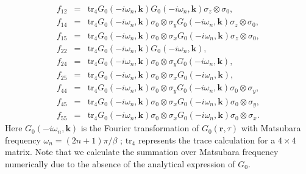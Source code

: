 \documentclass[prl,aps,twocolumn,showpacs, floatfix]{revtex4}
\begin{document}
\begin{widetext}
\begin{eqnarray}
f_{12} & =&\text{tr}_{4}{G}_{0}(-i\omega_{n},\mathbf{k}){G}_{0}(-i\omega_{n},%
\mathbf{k})\sigma_{z}\otimes\sigma_{0}, \\
f_{14} & =&\text{tr}_{4}{G}_{0}(-i\omega_{n},\mathbf{k})\sigma_{0}\otimes%
\sigma_{y}{G}_{0}(-i\omega_{n},\mathbf{k})\sigma_{z}\otimes\sigma_{0}, \\
f_{15} & =&\text{tr}_{4}{G}_{0}(-i\omega_{n},\mathbf{k})\sigma_{0}\otimes%
\sigma_{x}{G}_{0}(-i\omega_{n},\mathbf{k})\sigma_{z}\otimes\sigma_{0}, \\
f_{22} & =&\text{tr}_{4}{G}_{0}(-i\omega_{n},\mathbf{k}){G}_{0}(-i\omega_{n},%
\mathbf{k}), \\
f_{24} & =&\text{tr}_{4}{G}_{0}(-i\omega_{n},\mathbf{k})\sigma_{0}\otimes%
\sigma_{y}{G}_{0}(-i\omega_{n},\mathbf{k}), \\
f_{25} & =&\text{tr}_{4}{G}_{0}(-i\omega_{n},\mathbf{k})\sigma_{0}\otimes%
\sigma_{x}{G}_{0}(-i\omega_{n},\mathbf{k}), \\
f_{44} & =&\text{tr}_{4}{G}_{0}(-i\omega_{n},\mathbf{k})\sigma_{0}\otimes%
\sigma_{y}{G}_{0}(-i\omega_{n},\mathbf{k})\sigma_{0}\otimes\sigma_{y}, \\
f_{45} & =&\text{tr}_{4}{G}_{0}(-i\omega_{n},\mathbf{k})\sigma_{0}\otimes%
\sigma_{x}{G}_{0}(-i\omega_{n},\mathbf{k})\sigma_{0}\otimes\sigma_{y}, \\
f_{55} & =&\text{tr}_{4}{G}_{0}(-i\omega_{n},\mathbf{k})\sigma_{0}\otimes%
\sigma_{x}{G}_{0}(-i\omega_{n},\mathbf{k})\sigma_{0}\otimes\sigma_{x}.
\end{eqnarray}
Here $G_{0}(-i\omega_{n},\mathbf{k})$ is the Fourier transformation of $%
G_{0}(\mathbf{r},\tau)$ with Matsubara frequency $\omega_{n}=(2n+1)\pi/\beta$%
; $\text{tr}_{4}$ represents the trace calculation for a $4\times4$ matrix.
Note that we calculate the summation over Matsubara frequency numerically
due to the absence of the analytical expression of $G_0$.


\end{widetext}
\end{document}
